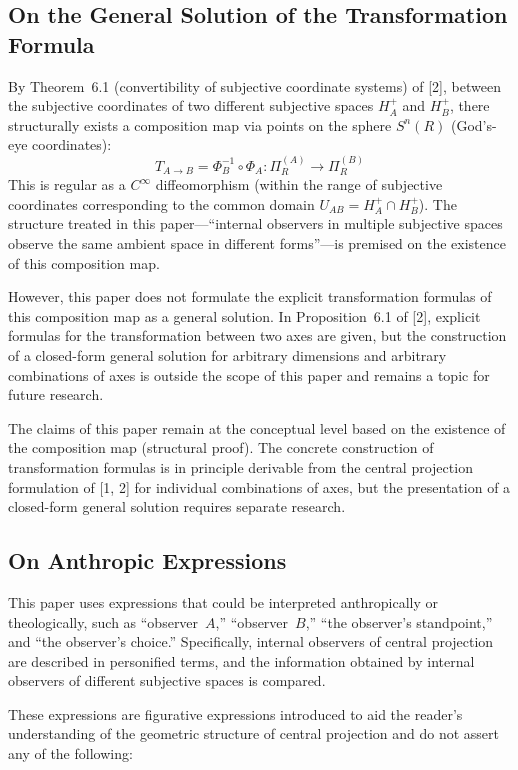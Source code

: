 \documentclass[a4paper,11pt]{article}
\theoremstyle{definition}
\begin{document}
\subsection{On the General Solution of the Transformation Formula}

By Theorem~6.1 (convertibility of subjective coordinate systems) of {[2]}, between the subjective coordinates of two different subjective spaces \(H_A^+\) and \(H_B^+\), there structurally exists a composition map via points on the sphere \(S^n(R)\) (God's-eye coordinates):
\[
T_{A \to B} = \Phi_B^{-1} \circ \Phi_A : \Pi_R^{(A)} \to \Pi_R^{(B)}
\]
This is regular as a \(C^\infty\) diffeomorphism (within the range of subjective coordinates corresponding to the common domain \(U_{AB} = H_A^+ \cap H_B^+\)). The structure treated in this paper---``internal observers in multiple subjective spaces observe the same ambient space in different forms''---is premised on the existence of this composition map.

However, this paper does not formulate the explicit transformation formulas of this composition map as a general solution. In Proposition~6.1 of {[2]}, explicit formulas for the transformation between two axes are given, but the construction of a closed-form general solution for arbitrary dimensions and arbitrary combinations of axes is outside the scope of this paper and remains a topic for future research.

The claims of this paper remain at the conceptual level based on the existence of the composition map (structural proof). The concrete construction of transformation formulas is in principle derivable from the central projection formulation of {[1, 2]} for individual combinations of axes, but the presentation of a closed-form general solution requires separate research.

\subsection{On Anthropic Expressions}

This paper uses expressions that could be interpreted anthropically or theologically, such as ``observer~\(A\),'' ``observer~\(B\),'' ``the observer's standpoint,'' and ``the observer's choice.'' Specifically, internal observers of central projection are described in personified terms, and the information obtained by internal observers of different subjective spaces is compared.

These expressions are figurative expressions introduced to aid the reader's understanding of the geometric structure of central projection and do not assert any of the following:
\end{document}
